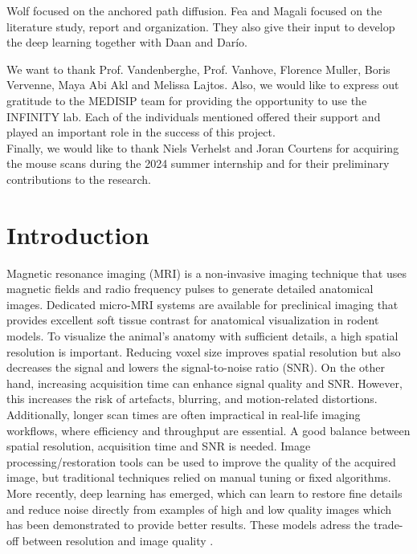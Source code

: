 \documentclass[twocolumn]{article}
\begin{document}
Wolf focused on the anchored path diffusion. Fea and Magali focused on the literature study, report and organization. 
They also give their input to develop the deep learning together with Daan and Darío.

We want to thank Prof. Vandenberghe, Prof. Vanhove, Florence Muller, Boris Vervenne, Maya Abi Akl and Melissa Lajtos. 
Also, we would like to express out gratitude to the MEDISIP team for providing the opportunity to use the INFINITY lab. 
Each of the individuals mentioned offered their support and played an important role in the success of this project. \\

Finally, we would like to thank Niels Verhelst and Joran Courtens for acquiring the mouse scans during the 2024 summer internship and for their preliminary contributions to the research.



\twocolumn
\section{Introduction}
Magnetic resonance imaging (MRI) is a non‐invasive imaging technique that uses magnetic fields and radio frequency pulses to generate detailed anatomical images. 
Dedicated micro-MRI systems are available for preclinical imaging that provides excellent soft tissue contrast for anatomical visualization in rodent models. 
To visualize the animal's anatomy with sufficient details, a high spatial resolution is important. Reducing voxel size improves spatial resolution but also decreases the signal and lowers the signal-to-noise ratio (SNR). 
On the other hand, increasing acquisition time can enhance signal quality and SNR. However, this increases the risk of artefacts, blurring, and motion-related distortions. 
Additionally, longer scan times are often impractical in real-life imaging workflows, where efficiency and throughput are essential. 
A good balance between spatial resolution, acquisition time and SNR is needed.
Image processing/restoration tools can be used to improve the quality of the acquired image, but traditional techniques relied on manual tuning or fixed
algorithms. More recently, deep learning has emerged, which can learn to restore fine details and reduce noise directly from
examples of high and low quality images which has been demonstrated to provide better results. These models adress the trade-off between resolution and image quality \cite{brown2014magnetic}. 
\end{document}
